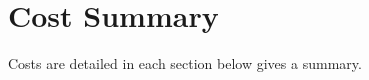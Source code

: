 \section{Cost Summary}\label{sec:cost}

Costs are detailed in each section below  gives a summary.


